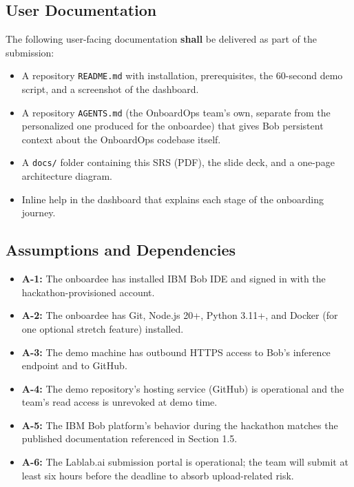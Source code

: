 \documentclass[11pt,letterpaper]{article}
\newcommand{\shall}{\textbf{shall}}
\begin{document}
\subsection{User Documentation}

The following user-facing documentation \shall{} be delivered as part of the submission:

\begin{itemize}
  \item A repository \texttt{README.md} with installation, prerequisites, the 60-second demo script, and a screenshot of the dashboard.
  \item A repository \texttt{AGENTS.md} (the OnboardOps team's own, separate from the personalized one produced for the onboardee) that gives Bob persistent context about the OnboardOps codebase itself.
  \item A \texttt{docs/} folder containing this SRS (PDF), the slide deck, and a one-page architecture diagram.
  \item Inline help in the dashboard that explains each stage of the onboarding journey.
\end{itemize}

\subsection{Assumptions and Dependencies}

\begin{itemize}
  \item \textbf{A-1:} The onboardee has installed IBM Bob IDE and signed in with the hackathon-provisioned account.
  \item \textbf{A-2:} The onboardee has Git, Node.js 20+, Python 3.11+, and Docker (for one optional stretch feature) installed.
  \item \textbf{A-3:} The demo machine has outbound HTTPS access to Bob's inference endpoint and to GitHub.
  \item \textbf{A-4:} The demo repository's hosting service (GitHub) is operational and the team's read access is unrevoked at demo time.
  \item \textbf{A-5:} The IBM Bob platform's behavior during the hackathon matches the published documentation referenced in Section 1.5.
  \item \textbf{A-6:} The Lablab.ai submission portal is operational; the team will submit at least six hours before the deadline to absorb upload-related risk.
\end{itemize}
\end{document}
